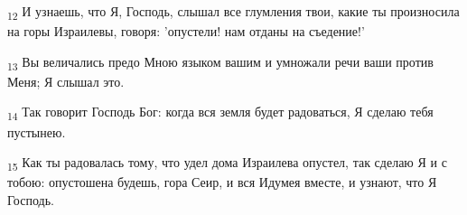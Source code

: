 \begin{tcolorbox}
\textsubscript{12} И узнаешь, что Я, Господь, слышал все глумления твои, какие ты произносила на горы Израилевы, говоря: 'опустели! нам отданы на съедение!'
\end{tcolorbox}
\begin{tcolorbox}
\textsubscript{13} Вы величались предо Мною языком вашим и умножали речи ваши против Меня; Я слышал это.
\end{tcolorbox}
\begin{tcolorbox}
\textsubscript{14} Так говорит Господь Бог: когда вся земля будет радоваться, Я сделаю тебя пустынею.
\end{tcolorbox}
\begin{tcolorbox}
\textsubscript{15} Как ты радовалась тому, что удел дома Израилева опустел, так сделаю Я и с тобою: опустошена будешь, гора Сеир, и вся Идумея вместе, и узнают, что Я Господь.
\end{tcolorbox}
